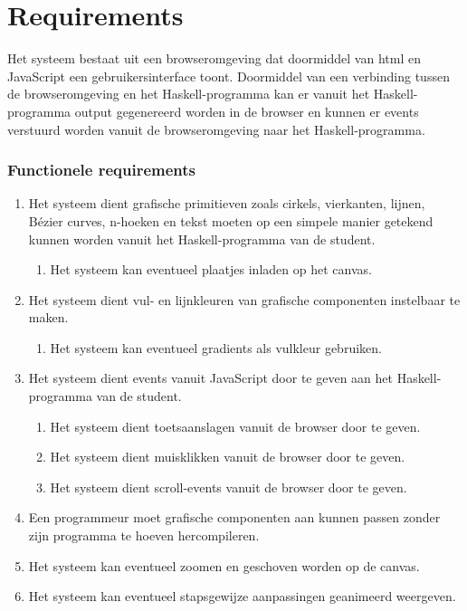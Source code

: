 \section{Requirements} \label{sec:requirements}
Het systeem bestaat uit een browseromgeving dat doormiddel van html en JavaScript een gebruikersinterface toont. Doormiddel van een verbinding tussen de browseromgeving en het Haskell-programma kan er vanuit het Haskell-programma output gegenereerd worden in de browser en kunnen er events verstuurd worden vanuit de browseromgeving naar het Haskell-programma.


\subsubsection{Functionele requirements}
\begin{enumerate}[{R}1]
	\item Het systeem dient grafische primitieven zoals cirkels, vierkanten, lijnen, Bézier curves, n-hoeken en tekst moeten op een simpele manier getekend kunnen worden vanuit het Haskell-programma van de student.
	\begin{enumerate}[{R1.}1]
		\item Het systeem kan eventueel plaatjes inladen op het canvas.
	\end{enumerate}
	\item Het systeem dient vul- en lijnkleuren van grafische componenten instelbaar te maken.
	\begin{enumerate}[{R2.}1]
		\item Het systeem kan eventueel gradients als vulkleur gebruiken.
	\end{enumerate}
	\item Het systeem dient events vanuit JavaScript door te geven aan het Haskell-programma van de student.
	\begin{enumerate}[{R3.}1]
		\item Het systeem dient toetsaanslagen vanuit de browser door te geven.
		\item Het systeem dient muisklikken vanuit de browser door te geven.
		\item Het systeem dient scroll-events vanuit de browser door te geven.
	\end{enumerate}
	\item Een programmeur moet grafische componenten aan kunnen passen zonder zijn programma te hoeven hercompileren.
	\item Het systeem kan eventueel zoomen en geschoven worden op de canvas.
	\item Het systeem kan eventueel stapsgewijze aanpassingen geanimeerd weergeven.

\end{enumerate}
